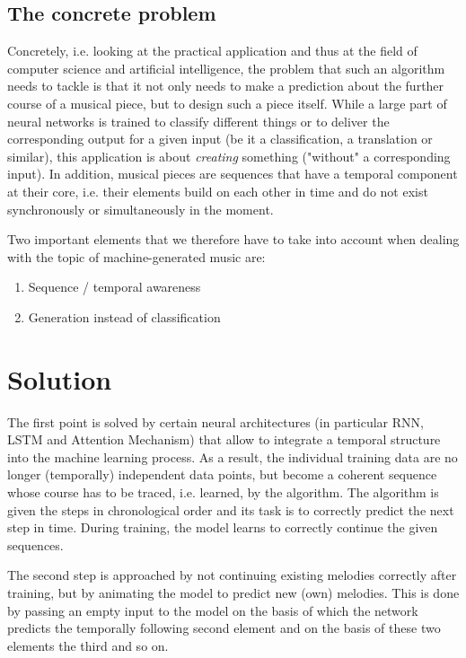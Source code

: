 \documentclass[a4paper, 10pt, xcolor=dvipsnames]{article} %
\begin{document}
\subsection{The concrete problem}

Concretely, i.e. looking at the practical application and thus at the field of
computer science and artificial intelligence, the problem that such an
algorithm needs to tackle is that it not only needs to make a prediction about
the further course of a musical piece, but to design such a piece itself. While
a large part of neural networks is trained to classify different things or to
deliver the corresponding output for a given input (be it a classification, a
translation or similar), this application is about \emph{creating} something
("without" a corresponding input). In addition, musical pieces are sequences
that have a temporal component at their core, i.e. their elements build on each
other in time and do not exist synchronously or simultaneously in the moment.

Two important elements that we therefore have to take into account when dealing
with the topic of machine-generated music are:
\begin{enumerate}
  \item Sequence / temporal awareness
  \item Generation instead of classification
\end{enumerate}


\section{Solution}
The first point is solved by certain neural architectures (in particular RNN,
LSTM and Attention Mechanism) that allow to integrate a temporal structure into
the machine learning process. As a result, the individual training data are no
longer (temporally) independent data points, but become a coherent sequence
whose course has to be traced, i.e. learned, by the algorithm. The algorithm is
given the steps in chronological order and its task is to correctly predict the
next step in time. During training, the model learns to correctly continue the
given sequences.

The second step is approached by not continuing existing melodies correctly
after training, but by animating the model to predict new (own) melodies. This
is done by passing an empty input to the model on the basis of which the
network predicts the temporally following second element and on the basis of
these two elements the third and so on.
\end{document}
